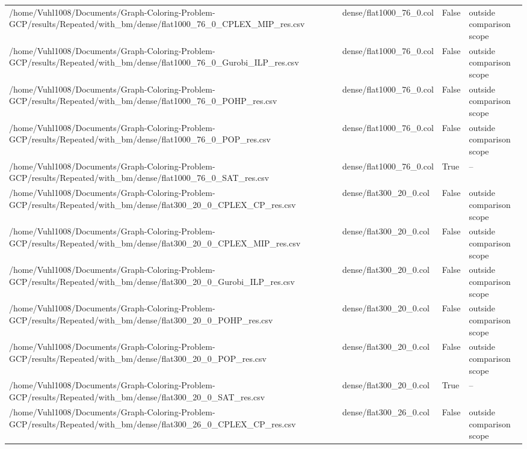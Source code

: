 \begin{table}[htbp]
\begin{tabular}{llll}
/home/Vuhl1008/Documents/Graph-Coloring-Problem-GCP/results/Repeated/with\_bm/dense/flat1000\_76\_0\_CPLEX\_MIP\_res.csv & dense/flat1000\_76\_0.col & False & outside comparison scope \\
/home/Vuhl1008/Documents/Graph-Coloring-Problem-GCP/results/Repeated/with\_bm/dense/flat1000\_76\_0\_Gurobi\_ILP\_res.csv & dense/flat1000\_76\_0.col & False & outside comparison scope \\
/home/Vuhl1008/Documents/Graph-Coloring-Problem-GCP/results/Repeated/with\_bm/dense/flat1000\_76\_0\_POHP\_res.csv & dense/flat1000\_76\_0.col & False & outside comparison scope \\
/home/Vuhl1008/Documents/Graph-Coloring-Problem-GCP/results/Repeated/with\_bm/dense/flat1000\_76\_0\_POP\_res.csv & dense/flat1000\_76\_0.col & False & outside comparison scope \\
/home/Vuhl1008/Documents/Graph-Coloring-Problem-GCP/results/Repeated/with\_bm/dense/flat1000\_76\_0\_SAT\_res.csv & dense/flat1000\_76\_0.col & True & -- \\
/home/Vuhl1008/Documents/Graph-Coloring-Problem-GCP/results/Repeated/with\_bm/dense/flat300\_20\_0\_CPLEX\_CP\_res.csv & dense/flat300\_20\_0.col & False & outside comparison scope \\
/home/Vuhl1008/Documents/Graph-Coloring-Problem-GCP/results/Repeated/with\_bm/dense/flat300\_20\_0\_CPLEX\_MIP\_res.csv & dense/flat300\_20\_0.col & False & outside comparison scope \\
/home/Vuhl1008/Documents/Graph-Coloring-Problem-GCP/results/Repeated/with\_bm/dense/flat300\_20\_0\_Gurobi\_ILP\_res.csv & dense/flat300\_20\_0.col & False & outside comparison scope \\
/home/Vuhl1008/Documents/Graph-Coloring-Problem-GCP/results/Repeated/with\_bm/dense/flat300\_20\_0\_POHP\_res.csv & dense/flat300\_20\_0.col & False & outside comparison scope \\
/home/Vuhl1008/Documents/Graph-Coloring-Problem-GCP/results/Repeated/with\_bm/dense/flat300\_20\_0\_POP\_res.csv & dense/flat300\_20\_0.col & False & outside comparison scope \\
/home/Vuhl1008/Documents/Graph-Coloring-Problem-GCP/results/Repeated/with\_bm/dense/flat300\_20\_0\_SAT\_res.csv & dense/flat300\_20\_0.col & True & -- \\
/home/Vuhl1008/Documents/Graph-Coloring-Problem-GCP/results/Repeated/with\_bm/dense/flat300\_26\_0\_CPLEX\_CP\_res.csv & dense/flat300\_26\_0.col & False & outside comparison scope \\

\end{tabular}
\end{table}
